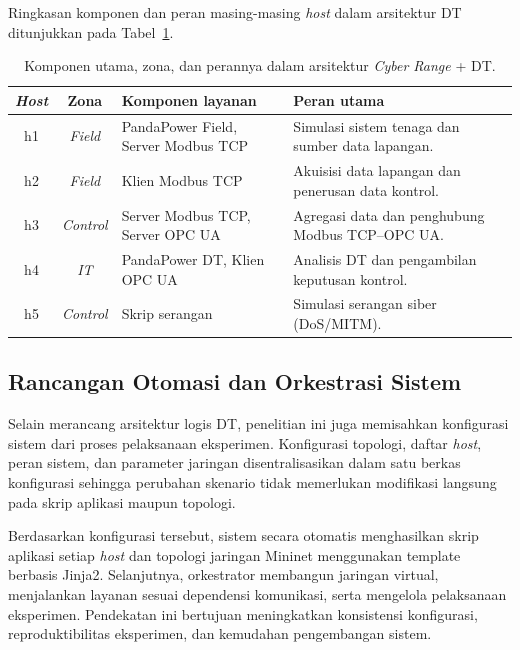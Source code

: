 Ringkasan komponen dan peran masing-masing \textit{host} dalam arsitektur \ac{DT} ditunjukkan pada Tabel~\ref{tab:komponen_peran}.

\renewcommand{\arraystretch}{1.3}
\begin{table}[htbp]
    \centering
    \caption{Komponen utama, zona, dan perannya dalam arsitektur \textit{Cyber Range} + DT.}
    \label{tab:komponen_peran}
    \begin{tabular}{|c|c|p{4cm}|p{6cm}|}
        \hline
        \textbf{\textit{Host}} & \textbf{Zona} & \textbf{Komponen layanan} & \textbf{Peran utama} \\
        \hline
        h1 & \textit{Field} & PandaPower Field, Server Modbus TCP & Simulasi sistem tenaga dan sumber data lapangan. \\
        
        h2 & \textit{Field} & Klien Modbus TCP & Akuisisi data lapangan dan penerusan data kontrol. \\
        
        h3 & \textit{Control} & Server Modbus TCP, Server OPC UA & Agregasi data dan penghubung Modbus TCP--OPC UA. \\
        
        h4 & \textit{IT} & PandaPower DT, Klien OPC UA & Analisis DT dan pengambilan keputusan kontrol. \\
        
        h5 & \textit{Control} & Skrip serangan & Simulasi serangan siber (\ac{DoS}/\ac{MITM}). \\
        \hline
    \end{tabular}
\end{table}

\subsection{Rancangan Otomasi dan Orkestrasi Sistem}
\label{subsec:rancangan_otomasi_dan_orkestrasi_sistem}
Selain merancang arsitektur logis \ac{DT}, penelitian ini juga memisahkan konfigurasi sistem dari proses pelaksanaan eksperimen. Konfigurasi topologi, daftar \textit{host}, peran sistem, dan parameter jaringan disentralisasikan dalam satu berkas konfigurasi sehingga perubahan skenario tidak memerlukan modifikasi langsung pada skrip aplikasi maupun topologi.

Berdasarkan konfigurasi tersebut, sistem secara otomatis menghasilkan skrip aplikasi setiap \textit{host} dan topologi jaringan Mininet menggunakan template berbasis Jinja2. Selanjutnya, orkestrator membangun jaringan virtual, menjalankan layanan sesuai dependensi komunikasi, serta mengelola pelaksanaan eksperimen. Pendekatan ini bertujuan meningkatkan konsistensi konfigurasi, reproduktibilitas eksperimen, dan kemudahan pengembangan sistem.

